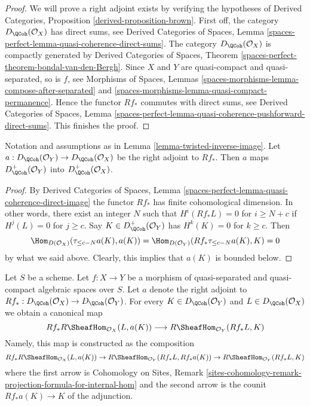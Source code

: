 \begin{proof}
We will prove a right adjoint exists by verifying the hypotheses of
Derived Categories, Proposition \ref{derived-proposition-brown}.
First off, the category $D_\QCoh(\mathcal{O}_X)$ has direct sums, see
Derived Categories of Spaces, Lemma
\ref{spaces-perfect-lemma-quasi-coherence-direct-sums}.
The category $D_\QCoh(\mathcal{O}_X)$ is compactly generated by
Derived Categories of Spaces, Theorem
\ref{spaces-perfect-theorem-bondal-van-den-Bergh}.
Since $X$ and $Y$ are quasi-compact and quasi-separated, so is $f$, see
Morphisms of Spaces, Lemmas
\ref{spaces-morphisms-lemma-compose-after-separated} and
\ref{spaces-morphisms-lemma-quasi-compact-permanence}.
Hence the functor $Rf_*$ commutes with direct sums, see
Derived Categories of Spaces, Lemma
\ref{spaces-perfect-lemma-quasi-coherence-pushforward-direct-sums}.
This finishes the proof.
\end{proof}

\begin{lemma}
\label{lemma-twisted-inverse-image-bounded-below}
Notation and assumptions as in Lemma \ref{lemma-twisted-inverse-image}.
Let $a : D_\QCoh(\mathcal{O}_Y) \to D_\QCoh(\mathcal{O}_X)$ be the right
adjoint to $Rf_*$. Then $a$ maps
$D^+_\QCoh(\mathcal{O}_Y)$ into $D^+_\QCoh(\mathcal{O}_X)$.
\end{lemma}

\begin{proof}
By Derived Categories of Spaces, Lemma
\ref{spaces-perfect-lemma-quasi-coherence-direct-image}
the functor $Rf_*$ has finite cohomological dimension. In other words,
there exist an integer $N$ such that
$H^i(Rf_*L) = 0$ for $i \geq N + c$ if $H^j(L) = 0$ for $j \geq c$.
Say $K \in D^+_\QCoh(\mathcal{O}_Y)$ has $H^k(K) = 0$ for $k \geq c$.
Then
$$
\Hom_{D(\mathcal{O}_X)}(\tau_{\leq c - N}a(K), a(K)) =
\Hom_{D(\mathcal{O}_Y)}(Rf_*\tau_{\leq c - N}a(K), K) = 0
$$
by what we said above. Clearly, this implies that $a(K)$ is bounded below.
\end{proof}

\noindent
Let $S$ be a scheme.
Let $f : X \to Y$ be a morphism of quasi-separated and quasi-compact
algebraic spaces over $S$.
Let $a$ denote the right adjoint to
$Rf_* : D_\QCoh(\mathcal{O}_X) \to D_\QCoh(\mathcal{O}_Y)$. For every
$K \in D_\QCoh(\mathcal{O}_Y)$ and $L \in D_\QCoh(\mathcal{O}_X)$
we obtain a canonical map
\begin{equation}
\label{equation-sheafy-trace}
Rf_*R\SheafHom_{\mathcal{O}_X}(L, a(K))
\longrightarrow
R\SheafHom_{\mathcal{O}_Y}(Rf_*L, K)
\end{equation}
Namely, this map is constructed as the composition
$$
Rf_*R\SheafHom_{\mathcal{O}_X}(L, a(K)) \to
R\SheafHom_{\mathcal{O}_Y}(Rf_*L, Rf_*a(K)) \to
R\SheafHom_{\mathcal{O}_Y}(Rf_*L, K)
$$
where the first arrow is 
Cohomology on Sites, Remark
\ref{sites-cohomology-remark-projection-formula-for-internal-hom}
and the second arrow is the counit $Rf_*a(K) \to K$ of the adjunction.

